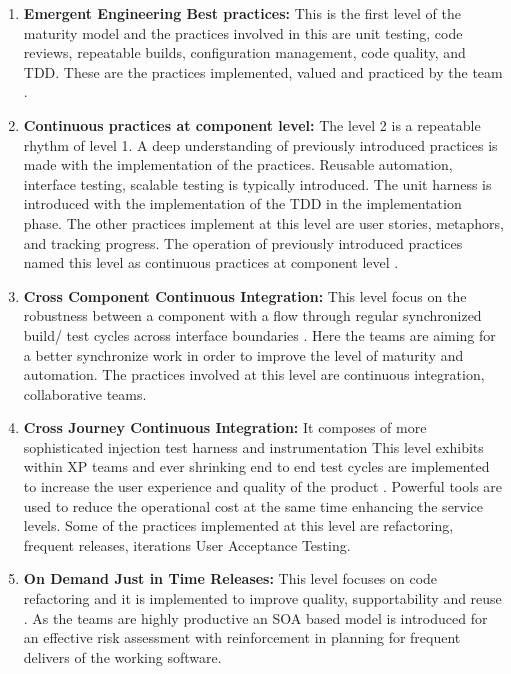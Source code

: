 \documentclass[a4paper,oneside]{bth}
\begin{document}
\begin{enumerate}


\item \textbf{Emergent Engineering Best practices:} This is the first level of the maturity model and the practices involved in this are unit testing, code reviews, repeatable builds, configuration management, code quality, and TDD. These are the practices implemented, valued and practiced by the team \cite{benefield_seven_2010}.
\item \textbf{Continuous practices at component level:} The level 2 is a repeatable rhythm of level 1. A deep understanding of previously introduced practices is made with the implementation of the practices. Reusable automation, interface testing, scalable testing is typically introduced. The unit harness is introduced with the implementation of the TDD in the implementation phase. The other practices implement at this level are user stories, metaphors, and tracking progress. The operation of previously introduced practices named this level as continuous practices at component level \cite{benefield_seven_2010}.
\item \textbf{Cross Component Continuous Integration:} This level focus on the robustness between a component with a flow through regular synchronized build/ test cycles across interface boundaries \cite{benefield_seven_2010}. Here the teams are aiming for a better synchronize work in order to improve the level of maturity and automation. The practices involved at this level are continuous integration, collaborative teams.
\item \textbf{Cross Journey Continuous Integration:} It composes of more sophisticated injection test harness and instrumentation This level exhibits within XP teams and ever shrinking end to end test cycles are implemented to increase the user experience and quality of the product \cite{benefield_seven_2010}. Powerful tools are used to reduce the operational cost at the same time enhancing the service levels. Some of the practices implemented at this level are refactoring, frequent releases, iterations User Acceptance Testing.
\item \textbf {On Demand Just in Time Releases:} This level focuses on code refactoring and it is implemented to improve quality, supportability and reuse \cite{benefield_seven_2010}. As the teams are highly productive an SOA based model is introduced for an effective risk assessment with reinforcement in planning for frequent delivers of the working software.
\end{enumerate}
\end{document}
